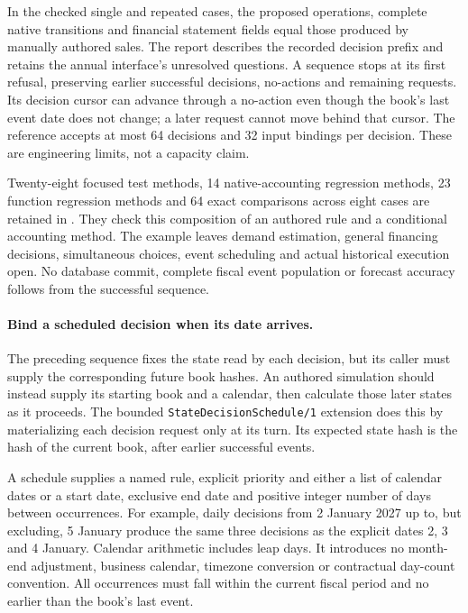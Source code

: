 In the checked single and repeated cases, the proposed operations, complete
native transitions and financial statement fields equal those produced by
manually authored sales. The report describes the recorded decision prefix and
retains the annual interface's unresolved questions. A sequence stops at its
first refusal, preserving earlier successful decisions, no-actions and remaining
requests. Its decision cursor can advance through a no-action even though the
book's last event date does not change; a later request cannot move behind that
cursor. The reference accepts at most 64 decisions and 32 input bindings per
decision. These are engineering limits, not a capacity claim.

Twenty-eight focused test methods, 14 native-accounting regression methods,
23 function regression methods and 64 exact comparisons across eight cases are
retained in .
They check this composition of an authored rule and a conditional accounting
method. The example leaves demand estimation, general financing decisions,
simultaneous choices, event scheduling and actual historical execution open.
No database commit, complete fiscal event population or forecast accuracy
follows from the successful sequence.


\paragraph{Bind a scheduled decision when its date arrives.}
The preceding sequence fixes the state read by each decision, but its caller
must supply the corresponding future book hashes. An authored simulation should
instead supply its starting book and a calendar, then calculate those later
states as it proceeds. The bounded \texttt{StateDecisionSchedule/1} extension
does this by materializing each decision request only at its turn. Its expected
state hash is the hash of the current book, after earlier successful events.

A schedule supplies a named rule, explicit priority and either a list of
calendar dates or a start date, exclusive end date and positive integer number
of days between occurrences. For example, daily decisions from 2 January 2027
up to, but excluding, 5 January produce the same three decisions as the explicit
dates 2, 3 and 4 January. Calendar arithmetic includes leap days. It introduces
no month-end adjustment, business calendar, timezone conversion or contractual
day-count convention. All occurrences must fall within the current fiscal
period and no earlier than the book's last event.


